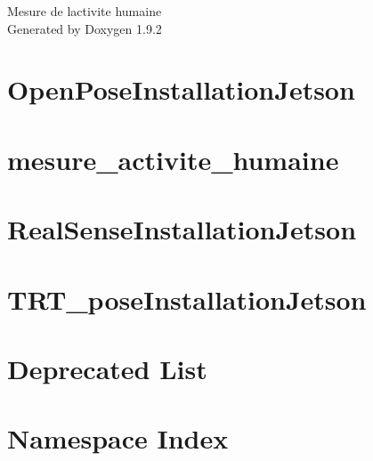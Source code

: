 \documentclass[twoside]{book}
\newcommand{\+}{\discretionary{\mbox{\scriptsize$\hookleftarrow$}}{}{}}
\newcommand{\clearemptydoublepage}{%
    \newpage{\pagestyle{empty}\cleardoublepage}%
  }
\begin{document}
  \raggedbottom
    \hypersetup{pageanchor=false,
                bookmarksnumbered=true,
                pdfencoding=unicode
               }
  \begin{titlepage}
  \vspace*{7cm}
  \begin{center}%
  {\Large Mesure de l\textquotesingle{}activite humaine}\\
  \vspace*{1cm}
  {\large Generated by Doxygen 1.9.2}\\
  \end{center}
  \end{titlepage}
  \clearemptydoublepage
  \tableofcontents
  \clearemptydoublepage
  \hypersetup{pageanchor=true}
\chapter{Open\+Pose\+Installation\+Jetson}
\label{md_OpenPoseInstallationJetson}

\chapter{mesure\+\_\+activite\+\_\+humaine}
\label{md_README}

\chapter{Real\+Sense\+Installation\+Jetson}
\label{md_RealSenseInstallationJetson}

\chapter{TRT\+\_\+pose\+Installation\+Jetson}
\label{md_TRT_poseInstallationJetson}

\chapter{Deprecated List}
\label{deprecated}

\chapter{Namespace Index}

\end{document}
